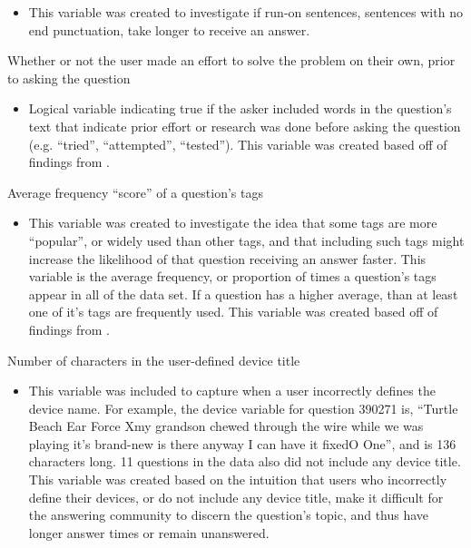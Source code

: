 \documentclass{article}
\begin{document}
\begin{itemize}
  \item This variable was created to investigate if run-on sentences, sentences with no end punctuation, take longer to receive an answer. 
\end{itemize}


Whether or not the user made an effort to solve the problem on their own, prior to asking the question

\begin{itemize}
  \item Logical variable indicating true if the asker included words in the question's text that indicate prior effort or research was done before asking the question (e.g. ``tried'', ``attempted'', ``tested''). This variable was created based off of findings from \cite{Bhat2014}. 
\end{itemize}


Average frequency ``score'' of a question's tags

\begin{itemize}
  \item This variable was created to investigate the idea that some tags are more ``popular'', or widely used than other tags, and that including such tags might increase the likelihood of that question receiving an answer faster. This variable is the average frequency, or proportion of times a question's tags appear in all of the data set. If a question has a higher average, than at least one of it's tags are frequently used. This variable was created based off of findings from \cite{Bhat2014}. 
\end{itemize}


Number of characters in the user-defined device title

\begin{itemize}
  \item This variable was included to capture when a user incorrectly defines the device name. For example, the device variable for question 390271 is, “Turtle Beach Ear Force Xmy grandson chewed through the wire while we was playing it's brand-new is there anyway I can have it fixedO One”, and is 136 characters long. 11 questions in the data also did not include any device title. This variable was created based on the intuition that users who incorrectly define their devices, or do not include any device title, make it difficult for the answering community to discern the question's topic, and thus have longer answer times or remain unanswered.
\end{itemize}
\end{document}

